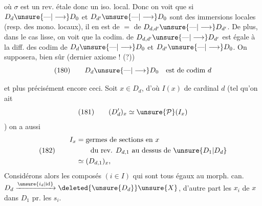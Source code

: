 où $\sigma$ est un rev. étale donc un iso. local. Donc on voit que si $D_d\unsure{\text{---}|\longrightarrow}D_0$ et $D_{d'}\unsure{\text{---}|\longrightarrow}D_0$ sont des immersions locales (resp. des mono. locaux), il en est de $=$ de $D_{d,d'}\unsure{\text{---}|\longrightarrow}D_{d'}$. De plus, dans le cas lisse, on voit que la codim. de $D_{d,d'}\unsure{\text{---}|\longrightarrow}D_{d'}$ est égale à la diff. des codim de $D_d\unsure{\text{---}|\longrightarrow}D_0$ et $D_{d'}\unsure{\text{---}|\longrightarrow}D_0$. On supposera, bien sûr (dernier axiome ! (?))
\[
(180)\qquad D_d\unsure{\text{---}|\longrightarrow}D_0\quad\text{est de codim }d
\]

 et plus précisément encore ceci. Soit  $x\in D_d$, d'où $I(x)$ de cardinal $d$ (tel qu'on ait
\[
(181)\qquad(D'_d)_x\simeq\unsure{\mathcal P}(I_x)
\]
)
  on a aussi
\[
(182)\qquad\begin{aligned}
I_x&=\text{germes de sections en }x\\
&\qquad\text{du rev. }D_{d,1}\text{ au dessus de }\unsure{D_1|D_d}\\
&\simeq(D_{d,1})_x,
\end{aligned}
\]
Considérons alors les composés $(i\in I)$
qui sont tous égaux au morph. can. $D_d\xrightarrow{\unsure{i_d|\mathrm{id}}}\deleted{\unsure{D_d}}\unsure{X}$, d'autre part les   $x_i$ de $x$ dans $D_1$ pr. les $s_i$.
